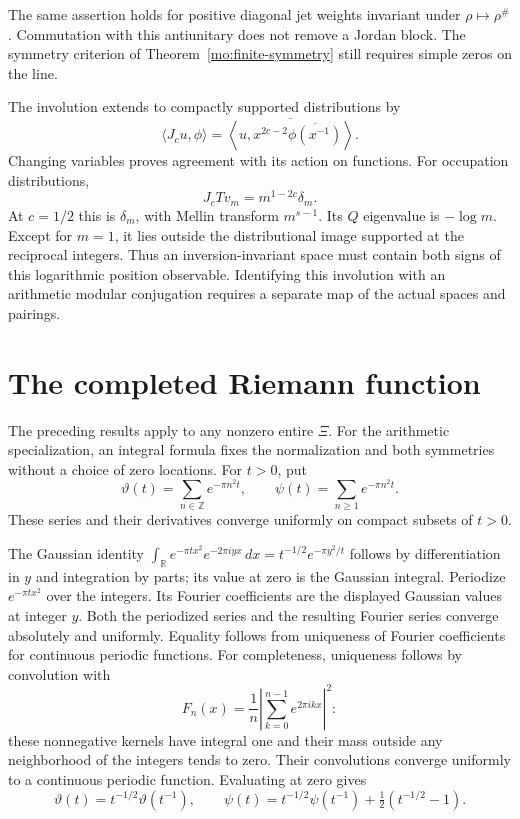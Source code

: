 The same assertion holds for positive diagonal jet weights invariant
under $\rho\mapsto\rho^\#$. Commutation with this antiunitary does
not remove a Jordan block. The symmetry criterion of
Theorem~\ref{mo:finite-symmetry} still requires simple zeros on the line.

The involution extends to compactly supported distributions by
\[
 \langle J_cu,\phi\rangle
 =\overline{\left\langle u,
         x^{2c-2}\overline{\phi(x^{-1})}\right\rangle}.
\]
Changing variables proves agreement with its action on functions.
For occupation distributions,
\[
 J_cTv_m=m^{1-2c}\delta_m.
\]
At $c=1/2$ this is $\delta_m$, with Mellin transform $m^{s-1}$.
Its $Q$ eigenvalue is $-\log m$. Except for $m=1$, it lies outside
the distributional image supported at the reciprocal integers.
Thus an inversion-invariant space must contain both signs of this
logarithmic position observable. Identifying this involution with
an arithmetic modular conjugation requires a separate map of the
actual spaces and pairings.

\section{The completed Riemann function}

The preceding results apply to any nonzero entire $\Xi$.
For the arithmetic specialization, an integral formula fixes the
normalization and both symmetries without a choice of zero locations.
For $t>0$, put
\[
 \vartheta(t)=\sum_{n\in\mathbb Z}e^{-\pi n^2t},\qquad
 \psi(t)=\sum_{n\geq1}e^{-\pi n^2t}.
\]
These series and their derivatives converge uniformly on compact
subsets of $t>0$.

The Gaussian identity
$\int_{\mathbb R}e^{-\pi t x^2}e^{-2\pi i yx}\,dx
=t^{-1/2}e^{-\pi y^2/t}$ follows by differentiation in $y$ and
integration by parts; its value at zero is the Gaussian integral.
Periodize $e^{-\pi t x^2}$ over the integers. Its Fourier coefficients
are the displayed Gaussian values at integer $y$. Both the
periodized series and the resulting Fourier series converge
absolutely and uniformly. Equality follows from uniqueness of
Fourier coefficients for continuous periodic functions. For
completeness, uniqueness follows by convolution with
\[
 F_n(x)=\frac1n\left|\sum_{k=0}^{n-1}e^{2\pi i kx}\right|^2:
\]
these nonnegative kernels have integral one and their mass outside
any neighborhood of the integers tends to zero. Their convolutions
converge uniformly to a continuous periodic function. Evaluating
at zero gives
\[
 \vartheta(t)=t^{-1/2}\vartheta(t^{-1}),\qquad
 \psi(t)=t^{-1/2}\psi(t^{-1})+\tfrac12(t^{-1/2}-1).
\]

